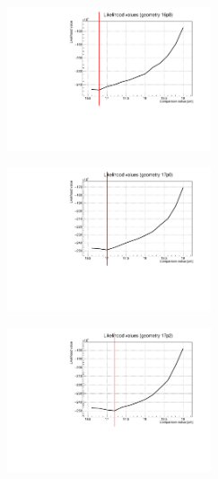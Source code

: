 \documentclass[a4paper, 11pt, twoside, openright]{report}
\begin{document}
\begin{figure}[htbp]
\centering
\begin{minipage}[b]{.32\textwidth}
\includegraphics[width=6cm, height=4.6cm]{figs/likelihood250LowStat/likelihood16p8.pdf}
\end{minipage}\hfill
\begin{minipage}[b]{.32\textwidth}
\includegraphics[width=6cm, height=4.6cm]{figs/likelihood250LowStat/likelihood17p0.pdf}
\end{minipage} \hfill
\begin{minipage}[b]{.32\textwidth}
\includegraphics[width=6cm, height=4.6cm]{figs/likelihood250LowStat/likelihood17p2.pdf}
\end{minipage} \hfill \vspace{10pt}


\end{figure}
\end{document}
